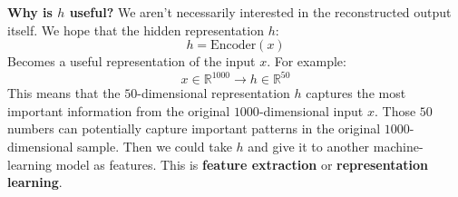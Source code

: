 \highspace
\textcolor{Green3}{ \textbf{Why is $h$ useful?}} We aren't necessarily interested in the reconstructed output itself. We hope that the hidden representation $h$:
\begin{equation*}
    h = \text{Encoder}(x)
\end{equation*}
Becomes a useful representation of the input $x$. For example:
\begin{equation*}
    x \in \mathbb{R}^{1000} \to h \in \mathbb{R}^{50}
\end{equation*}
This means that the $50$-dimensional representation $h$ captures the most important information from the original $1000$-dimensional input $x$. Those $50$ numbers can potentially capture important patterns in the original $1000$-dimensional sample. Then we could take $h$ and give it to another machine-learning model as features. This is \textbf{feature extraction} or \textbf{representation learning}.

